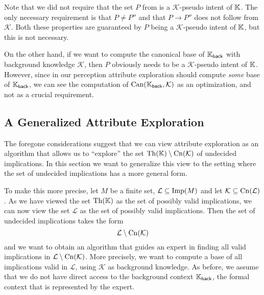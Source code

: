 Note that we did not require that the set $P$ from  is a $\mathcal{K}$-pseudo
intent of ${\mathbb{K}}$.  The only necessary requirement is that $P \neq P''$ and that $P \to
P''$ does not follow from $\mathcal{K}$.  Both these properties are guaranteed by $P$
being a $\mathcal{K}$-pseudo intent of ${\mathbb{K}}$, but this is not necessary.

On the other hand, if we want to compute the canonical base of ${\mathbb{K}}_{\mathsf{back}}$
with background knowledge $\mathcal{K}$, then $P$ obviously needs to be a
$\mathcal{K}$-pseudo intent of ${\mathbb{K}}$.  However, since in our perception attribute
exploration should compute \emph{some} base of ${\mathbb{K}}_{\mathsf{back}}$, we can see the
computation of $\operatorname{Can}({\mathbb{K}}_{\mathsf{back}}, \mathcal{K})$ as an optimization, and not as
a crucial requirement.

\subsection{A Generalized Attribute Exploration}
\label{sec:gener-attr-expl}

The foregone considerations suggest that we can view attribute exploration as an algorithm
that allows us to \enquote{explore} the set $\operatorname{Th}({\mathbb{K}}) \setminus \operatorname{Cn}(\mathcal{K})$ of
undecided implications.  In this section we want to generalize this view to the setting
where the set of undecided implications has a more general form.

To make this more precise, let $M$ be a finite set, $\mathcal{L} \subseteq \operatorname{Imp}(M)$ and
let $\mathcal{K} \subseteq \operatorname{Cn}(\mathcal{L})$.  As we have viewed the set $\operatorname{Th}({\mathbb{K}})$ as
the set of possibly valid implications, we can now view the set $\mathcal{L}$ as the set
of possibly valid implications.  Then the set of undecided implications takes the form
\begin{equation*}
  \mathcal{L} \setminus \operatorname{Cn}(\mathcal{K})
\end{equation*}
and we want to obtain an algorithm that guides an expert in finding all valid implications
in $\mathcal{L} \setminus \operatorname{Cn}(\mathcal{K})$.  More precisely, we want to compute a base of
all implications valid in $\mathcal{L}$, using $\mathcal{K}$ as background knowledge.  As
before, we assume that we do not have direct access to the background context ${\mathbb{K}}_{\mathsf{back}}$, the formal context that is represented by the expert.

